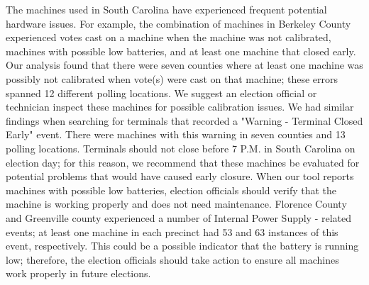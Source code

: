 The machines used in South Carolina have experienced frequent potential hardware issues.  For example, the combination of machines in Berkeley County experienced votes cast on a machine when the machine was not calibrated, machines with possible low batteries, and at least one machine that closed early.  Our analysis found that there were seven counties where at least one machine was possibly not calibrated when vote(s) were cast on that machine; these errors spanned 12 different polling locations.  We suggest an election official or technician inspect these machines for possible calibration issues.  We had similar findings when searching for terminals that recorded a "Warning - Terminal Closed Early" event.  There were machines with this warning in seven counties and 13 polling locations.  Terminals should not close before 7 P.M. in South Carolina on election day; for this reason, we recommend that these machines be evaluated for potential problems that would have caused early closure.  When our tool reports machines with possible low batteries, election officials should verify that the machine is working properly and does not need maintenance.  Florence County and Greenville county experienced a number of Internal Power Supply - related events; at least one machine in each precinct had 53 and 63 instances of this event, respectively.  This could be a possible indicator that the battery is running low; therefore, the election officials should take action to ensure all machines work properly in future elections.  
